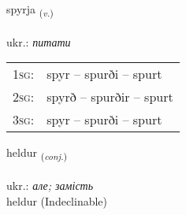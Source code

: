 \documentclass[frontgrid, backgrid]{flacards}\usepackage[]{graphicx}\usepackage[]{xcolor}
\begin{document}
{spyrja \small{\textsubscript{(\textit{v.})}} \\[1ex] %
\textphonetic{[spɪrja]} \\
ukr.: \emph{питати} \\  [2ex]
\renewcommand*{\arraystretch}{0.8}
\begin{tabular}{p{1cm}l}
\textsc{1sg}: & spyr -- spurði -- spurt \\ 
\textsc{2sg}: & spyrð -- spurðir -- spurt \\ 
\textsc{3sg}: & spyr -- spurði -- spurt \\ 
\end{tabular}
}


\renewcommand{\flhead}{\vskip5pt \fboxsep=0pt {\small\bfseries\footnotesize Samtenging | сполучник}}
\renewcommand{\fcfoot}{\vskip5pt \fboxsep=0pt \hspace{2pt}{\small\bfseries\footnotesize 1K}}

\renewcommand{\blhead}{\vskip5pt {\small\bfseries\footnotesize Samtenging | сполучник }}
\renewcommand{\bcfoot}{\vskip5pt \hspace{2pt}{\small\bfseries\footnotesize 1K}}


{heldur \small{\textsubscript{(\textit{conj.})}} \\[1ex]
\textphonetic{[hɛltʏr]} \\
ukr.: \emph{але; замість} \\  [2ex]
heldur (Indeclinable)}

\renewcommand{\flhead}{\vskip5pt \fboxsep=0pt {\small\bfseries\footnotesize Nafnorð | іменник}}
\renewcommand{\fcfoot}{\vskip5pt \fboxsep=0pt \hspace{2pt}{\small\bfseries\footnotesize 1K}}

\renewcommand{\blhead}{\vskip5pt {\small\bfseries\footnotesize Nafnorð | іменник }}
\renewcommand{\bcfoot}{\vskip5pt \hspace{2pt}{\small\bfseries\footnotesize 1K}}
\end{document}
